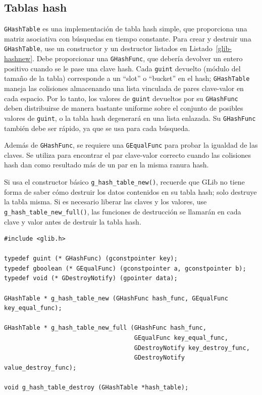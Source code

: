 \subsection{Tablas hash}

\lstinline{GHashTable} es una implementación de tabla hash simple, que proporciona una matriz asociativa con búsquedas en tiempo constante. Para crear y destruir una \lstinline{GHashTable}, use un constructor y un destructor listados en Listado~\ref{glib-hashnew}. Debe proporcionar una \lstinline{GHashFunc}, que debería devolver un entero positivo cuando se le pase una clave hash. Cada \lstinline{guint} devuelto (módulo del tamaño de la tabla) corresponde a un ``slot'' o ``bucket'' en el hash; \lstinline{GHashTable} maneja las colisiones almacenando una lista vinculada de pares clave-valor en cada espacio. Por lo tanto, los valores de \lstinline{guint} devueltos por su \lstinline{GHashFunc} deben distribuirse de manera bastante uniforme sobre el conjunto de posibles valores de \lstinline{guint}, o la tabla hash degenerará en una lista enlazada. Su \lstinline{GHashFunc} también debe ser rápido, ya que se usa para cada búsqueda.

Además de \lstinline{GHashFunc}, se requiere una \lstinline{GEqualFunc} para probar la igualdad de las claves. Se utiliza para encontrar el par clave-valor correcto cuando las colisiones hash dan como resultado más de un par en la misma ranura hash.

Si usa el constructor básico \lstinline{g_hash_table_new()}, recuerde que GLib no tiene forma de saber cómo destruir los datos contenidos en su tabla hash; solo destruye la tabla misma. Si es necesario liberar las claves y los valores, use \lstinline{g_hash_table_new_full()}, las funciones de destrucción se llamarán en cada clave y valor antes de destruir la tabla hash.

\begin{lstlisting}[style=GLib/GTK, caption={\lstinline{GHashTable} constructores y destructores}, label=glib-hashnew]
#include <glib.h>

typedef guint (* GHashFunc) (gconstpointer key);
typedef gboolean (* GEqualFunc) (gconstpointer a, gconstpointer b);
typedef void (* GDestroyNotify) (gpointer data);

GHashTable * g_hash_table_new (GHashFunc hash_func, GEqualFunc key_equal_func);

GHashTable * g_hash_table_new_full (GHashFunc hash_func,
                                    GEqualFunc key_equal_func,
                                    GDestroyNotify key_destroy_func,
                                    GDestroyNotify value_destroy_func);

void g_hash_table_destroy (GHashTable *hash_table);
\end{lstlisting}

